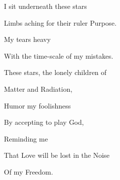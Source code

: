 \documentclass{article}
\begin{document}
\newline

I sit underneath these stars
\newline

Limbs aching for their ruler Purpose. 
\newline

My tears heavy 
\newline

With the time-scale of my mistakes. 
\newline

These stars, the lonely children of
\newline

Matter and Radiation, 
\newline

Humor my foolishness 
\newline

By accepting to play God,
\newline

Reminding me \newline

That Love will be lost in the Noise
\newline

Of my Freedom.
\newline
\end{document}
